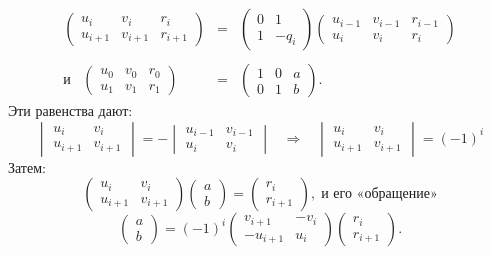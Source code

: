 $$\begin{array}{rcl}
\begin{pmatrix}
u_{i} & v_{i} & r_{i}\\
u_{i+1} & v_{i+1} & r_{i+1}
\end{pmatrix}&=&
\begin{pmatrix}
0 & 1\\
1 & -q_{i}
\end{pmatrix}
\begin{pmatrix}
u_{i-1} & v_{i-1} & r_{i-1}\\
u_{i} & v_{i} & r_{i}
\end{pmatrix}\\
\;\\
\text{и}\;\;\;
\begin{pmatrix}
u_{0} & v_{0} & r_{0}\\
u_{1} & v_{1} & r_{1}
\end{pmatrix}&=&
\begin{pmatrix}
1 & 0 & a\\
0 & 1 & b
\end{pmatrix}.
\end{array}$$
Эти равенства дают:
$$\begin{vmatrix}
u_{i} & v_{i}\\
u_{i+1} & v_{i+1}
\end{vmatrix} =-
\begin{vmatrix}
u_{i-1} & v_{i-1}\\
u_{i} & v_{i}
\end{vmatrix}\;\;\;\Rightarrow\;\;\;
\begin{vmatrix}
u_{i} & v_{i}\\
u_{i+1} & v_{i+1}
\end{vmatrix}=(-1)^i$$
Затем:
$$\begin{pmatrix}
u_{i} & v_{i}\\
u_{i+1} & v_{i+1}
\end{pmatrix}
\begin{pmatrix}
a\\
b
\end{pmatrix}=
\begin{pmatrix}
r_{i}\\
r_{i+1}
\end{pmatrix},\;\text{и его «обращение»}$$
\newpage
$$\begin{pmatrix}
a\\
b
\end{pmatrix}
=(-1)^i
\begin{pmatrix}
v_{i+1} & -v_{i}\\
-u_{i+1} & u_{i}
\end{pmatrix}
\begin{pmatrix}
r_{i}\\
r_{i+1}
\end{pmatrix}.$$
